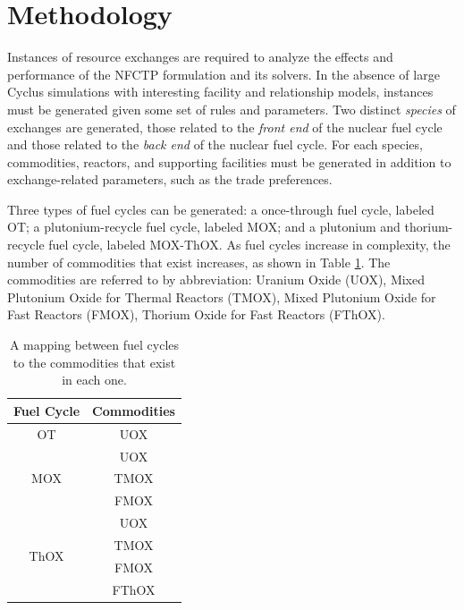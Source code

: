 \documentclass{anstrans}
\begin{document}
\section{Methodology}

Instances of resource exchanges are required to analyze the effects and
performance of the NFCTP formulation and its solvers. In the absence of large
Cyclus simulations with interesting facility and relationship models, instances
must be generated given some set of rules and parameters. Two distinct
\textit{species} of exchanges are generated, those related to the \textit{front
  end} of the nuclear fuel cycle and those related to the \textit{back end} of
the nuclear fuel cycle. For each species, commodities, reactors, and supporting
facilities must be generated in addition to exchange-related parameters, such as
the trade preferences.

Three types of fuel cycles can be generated: a once-through fuel cycle, labeled
OT; a plutonium-recycle fuel cycle, labeled MOX; and a plutonium and
thorium-recycle fuel cycle, labeled MOX-ThOX. As fuel cycles increase in
complexity, the number of commodities that exist increases, as shown in Table
\ref{tbl:fc_to_commods}. The commodities are referred to by abbreviation:
Uranium Oxide (UOX), Mixed Plutonium Oxide for Thermal Reactors (TMOX), Mixed
Plutonium Oxide for Fast Reactors (FMOX), Thorium Oxide for Fast Reactors
(FThOX).

\begin{table}[h!]
\centering
\caption{A mapping between fuel cycles to the commodities that exist in each one.}
\label{tbl:fc_to_commods}
\begin{tabular}{|c|c|}
\hline
\textbf{Fuel Cycle}            & \textbf{Commodities} \\ \hline
OT                    & UOX         \\ \hline
\multirow{3}{*}{MOX}  & UOX         \\  
                      & TMOX        \\  
                      & FMOX        \\ \hline
\multirow{4}{*}{ThOX} & UOX         \\  
                      & TMOX        \\  
                      & FMOX        \\  
                      & FThOX       \\ \hline
\end{tabular}
\end{table}
\end{document}
